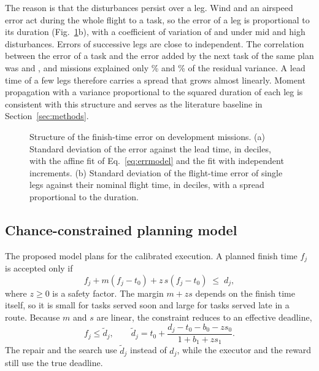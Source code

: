 The reason is that the disturbances persist over a leg. Wind and an airspeed error act during the whole flight to a
task, so the error of a leg is proportional to its duration (Fig.~\ref{fig:errstructure}b), with a coefficient of
variation of  and  under mid and high disturbances. Errors of successive legs are close to
independent. The correlation between the error of a task and the error added by the next task of the same plan was
 and , and missions explained only \% and
\% of the residual variance. A lead time of a few legs therefore carries a spread that grows
almost linearly. Moment propagation with a variance proportional to the squared duration of each leg is consistent
with this structure and serves as the literature baseline in Section~\ref{sec:methods}.

\begin{figure}[t]
\centering
{}
\caption{Structure of the finish-time error on development missions. (a) Standard deviation of the error against the
lead time, in deciles, with the affine fit of Eq.~\eqref{eq:errmodel} and the fit with independent increments. (b)
Standard deviation of the flight-time error of single legs against their nominal flight time, in deciles, with a
spread proportional to the duration.}\label{fig:errstructure}
\end{figure}

\subsection{Chance-constrained planning model}\label{sec:cc}
The proposed model plans for the calibrated execution. A planned finish time $f_j$ is accepted only if
\begin{equation}\label{eq:ccfinish}
f_j+m(f_j-t_0)+z\,s(f_j-t_0)\;\le\;d_j ,
\end{equation}
where $z\ge0$ is a safety factor. The margin $m+zs$ depends on the finish time itself, so it is small for tasks served
soon and large for tasks served late in a route. Because $m$ and $s$ are linear, the constraint reduces to an effective
deadline,
\begin{equation}\label{eq:cc}
f_j\le\tilde d_j,\qquad \tilde d_j=t_0+\frac{d_j-t_0-b_0-z s_0}{1+b_1+z s_1}.
\end{equation}
The repair and the search use $\tilde d_j$ instead of $d_j$, while the executor and the reward still use the true
deadline.

